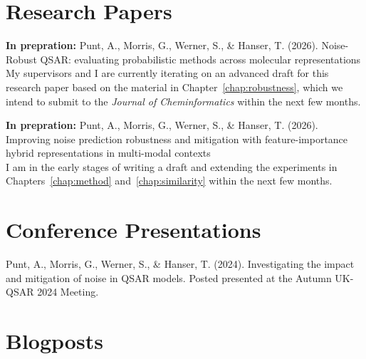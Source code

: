 \section{Research Papers}
\textbf{In prepration:} Punt, A., Morris, G., Werner, S., \& Hanser, T. (2026). Noise-Robust QSAR: evaluating probabilistic methods across molecular representations \\
My supervisors and I are currently iterating on an advanced draft for this research paper based on the material in Chapter~\ref{chap:robustness}, which we intend to submit to the \textit{Journal of Cheminformatics} within the next few months.

\textbf{In prepration:} Punt, A., Morris, G., Werner, S., \& Hanser, T. (2026). Improving noise prediction robustness and mitigation with feature-importance hybrid representations in multi-modal contexts \\ I am in the early stages of writing a draft and extending the experiments in Chapters~\ref{chap:method} and~\ref{chap:similarity} within the next few months.

\section{Conference Presentations}
Punt, A., Morris, G., Werner, S., \& Hanser, T. (2024). Investigating the impact and mitigation of noise in QSAR models. Posted presented at the Autumn UK-QSAR 2024 Meeting.


\section{Blogposts}

